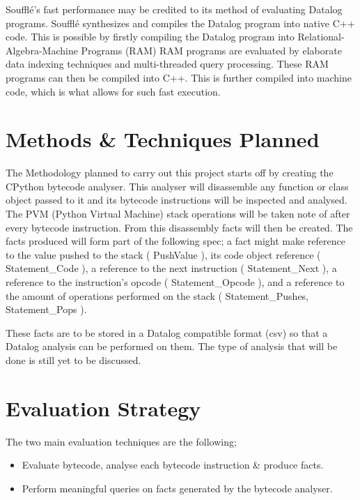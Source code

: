 \documentclass[12pt, a4paper]{report}
\theoremstyle{definition}
\theoremstyle{definition}%
\theoremstyle{definition}%
\theoremstyle{definition}%
\theoremstyle{definition}%
\theoremstyle{definition}%
\begin{document}
    \par Soufflé's fast performance may be credited to its method of evaluating Datalog programs. Soufflé synthesizes and compiles
    the Datalog program into native C++ code. This is possible by firstly compiling the Datalog program into Relational-Algebra-Machine Programs (RAM)
    RAM programs are evaluated by elaborate data indexing techniques and multi-threaded query processing. These RAM programs can then be compiled
    into C++. This is further compiled into machine code, which is what allows for such fast execution. %


\chapter{Methods \& Techniques Planned}
The Methodology planned to carry out this project starts off by creating the CPython bytecode analyser. This analyser will disassemble 
any function or class object passed to it and its bytecode instructions will be inspected and analysed. The PVM (Python Virtual Machine)
stack operations will be taken note of after every bytecode instruction. From this disassembly facts will then be created. The facts produced will
form part of the following spec; a fact might make reference to the value pushed to the stack ({\selectfont 
PushValue%
}), its code object reference ({\selectfont 
Statement\_Code%
}), a reference to the next instruction ({\selectfont 
Statement\_Next%
}), a reference to the instruction's opcode ({\selectfont 
Statement\_Opcode%
}), and a reference to the amount of operations performed on the stack ({\selectfont 
Statement\_Pushes, Statement\_Pops%
}).
\par These facts are to be stored in a Datalog compatible format (csv) so that a Datalog analysis can be performed on them. The type of analysis 
that will be done is still yet to be discussed.


\chapter{Evaluation Strategy}
\par The two main evaluation techniques are the following;
    \begin{itemize}
        \item Evaluate bytecode, analyse each bytecode instruction \& produce facts.
        \item Perform meaningful queries on facts generated by the bytecode analyser.
    \end{itemize}
\end{document}
